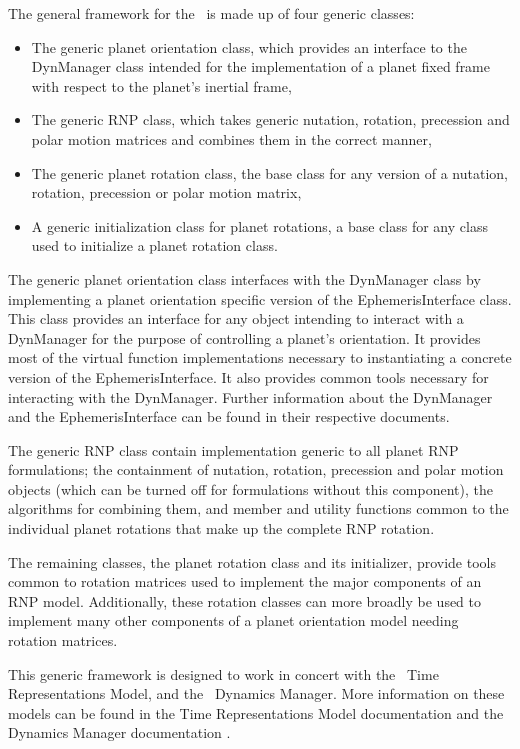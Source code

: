 The general framework for the \ModelDesc\ is made up of four generic classes:

\begin{itemize}
\item{The generic planet orientation class}, which provides an interface to
the DynManager class intended for the implementation of a planet fixed
frame with respect to the planet's inertial frame,
\item{The generic RNP class}, which takes generic nutation, rotation, 
precession and polar motion matrices and combines them in the correct manner,
\item{The generic planet rotation class}, the base class for any version
of a nutation, rotation, precession or polar motion matrix,
\item{A generic initialization class for planet rotations}, a base class for
any class used to initialize a planet rotation class.
\end{itemize}

The generic planet orientation class interfaces with the DynManager class
by implementing a planet orientation specific version of the EphemerisInterface
class. This class provides an interface for any object intending to interact with a DynManager
for the purpose of controlling a planet's orientation. It provides most of the virtual
function implementations necessary to instantiating a concrete version of the EphemerisInterface.
It also provides common tools necessary for interacting with the DynManager. Further
information about the DynManager \cite{dynenv:DYNMANAGER} and the EphemerisInterface
\cite{dynenv:EPHEMERIDES} can be found in their respective documents.

The generic RNP class contain implementation generic to all planet RNP formulations;
the containment of nutation, rotation, precession and polar motion objects (which can
be turned off for formulations without this component),
the algorithms for combining them, and member and utility functions
common to the individual planet rotations that make up the complete RNP rotation.

The remaining classes, the planet rotation class and its initializer, provide
tools common to rotation matrices used to implement the major components
of an RNP model. Additionally, these rotation classes can more broadly be used
to implement many other components of a planet orientation model needing
rotation matrices.

This generic framework is designed to work in concert with the \JEODid\
Time Representations Model, and the \JEODid\ Dynamics Manager. More information on these
models can be found in the Time Representations Model documentation \cite{dynenv:TIME} and the
Dynamics Manager documentation \cite{dynenv:DYNMANAGER}.


